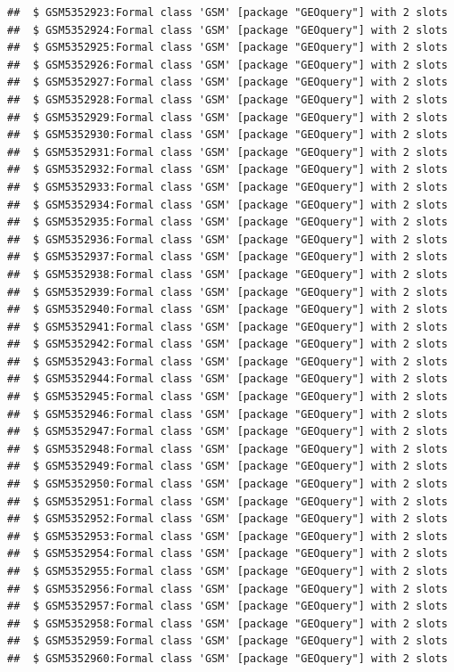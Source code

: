 \documentclass[
]{book}
\begin{document}
\begin{verbatim}
##  $ GSM5352923:Formal class 'GSM' [package "GEOquery"] with 2 slots
##  $ GSM5352924:Formal class 'GSM' [package "GEOquery"] with 2 slots
##  $ GSM5352925:Formal class 'GSM' [package "GEOquery"] with 2 slots
##  $ GSM5352926:Formal class 'GSM' [package "GEOquery"] with 2 slots
##  $ GSM5352927:Formal class 'GSM' [package "GEOquery"] with 2 slots
##  $ GSM5352928:Formal class 'GSM' [package "GEOquery"] with 2 slots
##  $ GSM5352929:Formal class 'GSM' [package "GEOquery"] with 2 slots
##  $ GSM5352930:Formal class 'GSM' [package "GEOquery"] with 2 slots
##  $ GSM5352931:Formal class 'GSM' [package "GEOquery"] with 2 slots
##  $ GSM5352932:Formal class 'GSM' [package "GEOquery"] with 2 slots
##  $ GSM5352933:Formal class 'GSM' [package "GEOquery"] with 2 slots
##  $ GSM5352934:Formal class 'GSM' [package "GEOquery"] with 2 slots
##  $ GSM5352935:Formal class 'GSM' [package "GEOquery"] with 2 slots
##  $ GSM5352936:Formal class 'GSM' [package "GEOquery"] with 2 slots
##  $ GSM5352937:Formal class 'GSM' [package "GEOquery"] with 2 slots
##  $ GSM5352938:Formal class 'GSM' [package "GEOquery"] with 2 slots
##  $ GSM5352939:Formal class 'GSM' [package "GEOquery"] with 2 slots
##  $ GSM5352940:Formal class 'GSM' [package "GEOquery"] with 2 slots
##  $ GSM5352941:Formal class 'GSM' [package "GEOquery"] with 2 slots
##  $ GSM5352942:Formal class 'GSM' [package "GEOquery"] with 2 slots
##  $ GSM5352943:Formal class 'GSM' [package "GEOquery"] with 2 slots
##  $ GSM5352944:Formal class 'GSM' [package "GEOquery"] with 2 slots
##  $ GSM5352945:Formal class 'GSM' [package "GEOquery"] with 2 slots
##  $ GSM5352946:Formal class 'GSM' [package "GEOquery"] with 2 slots
##  $ GSM5352947:Formal class 'GSM' [package "GEOquery"] with 2 slots
##  $ GSM5352948:Formal class 'GSM' [package "GEOquery"] with 2 slots
##  $ GSM5352949:Formal class 'GSM' [package "GEOquery"] with 2 slots
##  $ GSM5352950:Formal class 'GSM' [package "GEOquery"] with 2 slots
##  $ GSM5352951:Formal class 'GSM' [package "GEOquery"] with 2 slots
##  $ GSM5352952:Formal class 'GSM' [package "GEOquery"] with 2 slots
##  $ GSM5352953:Formal class 'GSM' [package "GEOquery"] with 2 slots
##  $ GSM5352954:Formal class 'GSM' [package "GEOquery"] with 2 slots
##  $ GSM5352955:Formal class 'GSM' [package "GEOquery"] with 2 slots
##  $ GSM5352956:Formal class 'GSM' [package "GEOquery"] with 2 slots
##  $ GSM5352957:Formal class 'GSM' [package "GEOquery"] with 2 slots
##  $ GSM5352958:Formal class 'GSM' [package "GEOquery"] with 2 slots
##  $ GSM5352959:Formal class 'GSM' [package "GEOquery"] with 2 slots
##  $ GSM5352960:Formal class 'GSM' [package "GEOquery"] with 2 slots

\end{verbatim}
\end{document}
